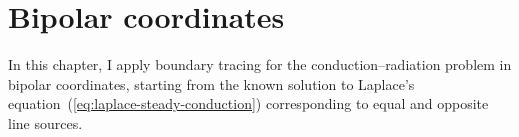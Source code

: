 \chapter{Bipolar coordinates}
\label{ch:bipolar}

In this chapter,
I apply boundary tracing for the conduction--radiation problem
in bipolar coordinates,
starting from the known solution
to Laplace's equation~(\ref{eq:laplace-steady-conduction})
corresponding to equal and opposite line sources.
